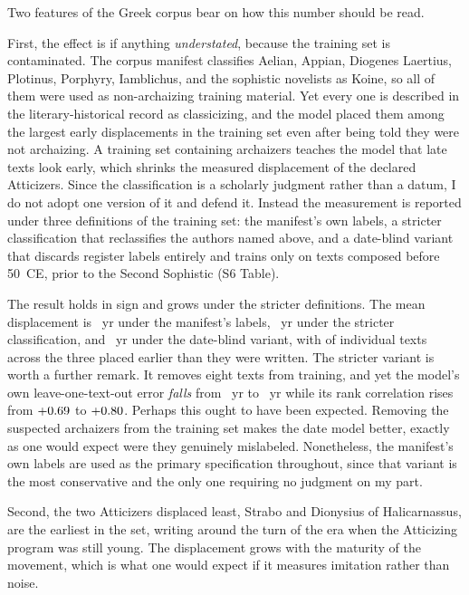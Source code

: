 \documentclass[10pt,letterpaper]{article}
\begin{document}
Two features of the Greek corpus bear on how this number should be read.

First, the effect is if anything \emph{understated}, because the training set is
contaminated.  The corpus manifest classifies Aelian, Appian, Diogenes Laertius,
Plotinus, Porphyry, Iamblichus, and the sophistic novelists as Koine, so all of
them were used as non-archaizing training material.  Yet every one is described
in the literary-historical record as classicizing, and the model placed them
among the largest early displacements in the training set even after being told
they were not archaizing.  A training set containing archaizers teaches the
model that late texts look early, which shrinks the measured displacement of the
declared Atticizers.  Since the classification is a scholarly judgment rather
than a datum, I do not adopt one version of it and defend it.  Instead the
measurement is reported under three definitions of the training set: the
manifest's own labels, a stricter classification that reclassifies the authors
named above, and a date-blind variant that discards register labels entirely and
trains only on texts composed before 50~CE, prior to the Second Sophistic
(S6 Table).

The result holds in sign and grows under the stricter definitions.  The mean
displacement is \GKattshift~yr under the manifest's labels, \GKattshiftB~yr
under the stricter classification, and \GKattshiftC~yr under the date-blind
variant, with \GKattearlyTot{} of \GKattTot{} individual texts across the three
placed earlier than they were written.  The stricter variant is worth a further
remark.  It removes eight texts from training, and yet the model's own
leave-one-text-out error \emph{falls} from \GKmae~yr to \GKmaeB~yr while its
rank correlation rises from $+0.69$ to $+0.80$.  Perhaps this ought to have
been expected.  Removing the suspected
archaizers from the training set makes the date model better, exactly as one
would expect were they genuinely mislabeled.  Nonetheless, the manifest's own
labels are used as the primary specification throughout, since that variant is
the most conservative and the only one requiring no judgment on my part.

Second, the two Atticizers displaced least, Strabo and Dionysius of
Halicarnassus, are the earliest in the set, writing around the turn of the era
when the Atticizing program was still young.  The displacement grows with the
maturity of the movement, which is what one would expect if it measures
imitation rather than noise.
\end{document}
